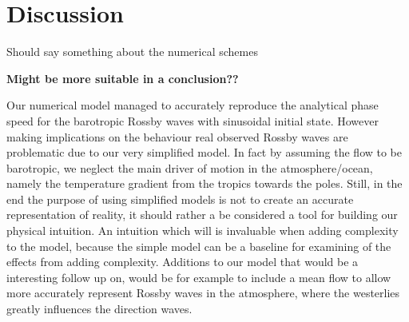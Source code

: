 \section{Discussion}
Should say something about the numerical schemes 

\textbf{Might be more suitable in a conclusion??}

Our numerical model managed to accurately reproduce the analytical phase speed
for the barotropic Rossby waves with sinusoidal initial state. However making
implications on the behaviour real 
observed Rossby waves are problematic due to our very simplified model. In fact
by assuming the flow to be barotropic, we neglect the main driver of
motion in the atmosphere/ocean, namely the temperature gradient from the tropics
towards the poles. Still, in the end the purpose of using simplified models is
not to create an accurate representation of reality, it should rather a be
considered a tool for building our physical intuition. An intuition which will
is invaluable when adding complexity to the model, because the simple model can
be a baseline for examining of the effects from adding complexity.
Additions to our model that would be a interesting follow up on, would be for
example to include a mean flow to allow more accurately represent Rossby waves
in the atmosphere, where the westerlies greatly influences the direction waves.  